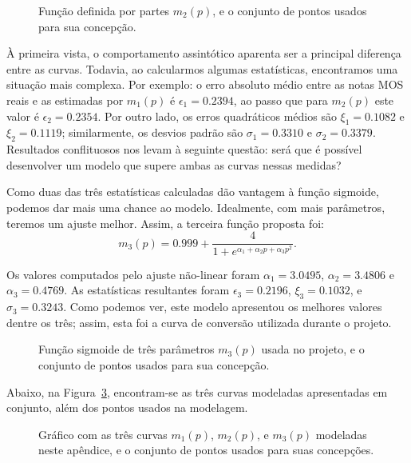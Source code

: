 \begin{figure}[!ht]
	\centering
	
	\caption[Curva definida por partes de conversão de PAQM para MOS]{Função definida por partes $m_2(p)$, e o conjunto de pontos usados para sua concepção.}
	\label{fig:paqmtomos:piecewise}
\end{figure}

À primeira vista, o comportamento assintótico aparenta ser a principal diferença entre as curvas. Todavia, ao calcularmos algumas estatísticas, encontramos uma situação mais complexa. Por exemplo: o erro absoluto médio entre as notas MOS reais e as estimadas por $m_1(p)$ é $\epsilon_1 = 0.2394$, ao passo que para $m_2(p)$ este valor é $\epsilon_2 = 0.2354$. Por outro lado, os erros quadráticos médios são $\xi_1 = 0.1082$ e $\xi_2 = 0.1119$; similarmente, os desvios padrão são $\sigma_1 = 0.3310$ e $\sigma_2 = 0.3379$. Resultados conflituosos nos levam à seguinte questão: será que é possível desenvolver um modelo que supere ambas as curvas nessas medidas?

Como duas das três estatísticas calculadas dão vantagem à função sigmoide, podemos dar
mais uma chance ao modelo. Idealmente, com mais parâmetros, teremos um ajuste melhor.
Assim, a terceira função proposta foi:
\begin{equation}
	m_3(p) = 0.999 + \frac{4}{1 + e^{\alpha_1 + \alpha_2 p + \alpha_3 p^2}}.
\end{equation}

Os valores computados pelo ajuste não-linear foram $\alpha_1 = 3.0495$, $\alpha_2 =
	3.4806$ e $\alpha_3 = 0.4769$. As estatísticas resultantes foram $\epsilon_3 = 0.2196$,
$\xi_3 = 0.1032$, e $\sigma_3 = 0.3243$. Como podemos ver, este modelo apresentou os
melhores valores dentre os três; assim, esta foi a curva de conversão utilizada durante
o projeto.

\begin{figure}[!ht]
	\centering
	
	\caption[Sigmoide de três parâmetros de conversão de PAQM para MOS]{Função sigmoide de três parâmetros $m_3(p)$ usada no projeto, e o conjunto de pontos usados para sua concepção.}
	\label{fig:paqmtomos:sigmoid3}
\end{figure}

Abaixo, na Figura~\ref{fig:paqmtomos:all}, encontram-se as três curvas modeladas
apresentadas em conjunto, além dos pontos usados na modelagem.

\begin{figure}[!ht]
	\centering
	
	\caption[Todas as curvas de conversão de PAQM para MOS]{Gráfico com as três curvas $m_1(p)$, $m_2(p)$, e $m_3(p)$ modeladas neste apêndice, e o conjunto de pontos usados para suas concepções.}
	\label{fig:paqmtomos:all}
\end{figure}
